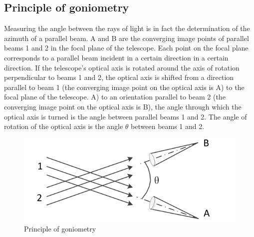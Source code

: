 \documentclass[UTF8]{article}
\begin{document}
	\subsection{Principle of goniometry}
	Measuring the angle between the rays of light is in fact the determination of the azimuth of a parallel beam. A and B are the converging image points of parallel beams 1 and 2 in the focal plane of the telescope. Each point on the focal plane corresponds to a parallel beam incident in a certain direction in a certain direction. If the telescope's optical axis is rotated around the axis of rotation perpendicular to beams 1 and 2, the optical axis is shifted from a direction parallel to beam 1 (the converging image point on the optical axis is A) to the focal plane of the telescope. A) to an orientation parallel to beam 2 (the converging image point on the optical axis is B), the angle through which the optical axis is turned is the angle between parallel beams 1 and 2. The angle of rotation of the optical axis is the angle $\theta $ between beams 1 and 2.
	\begin{figure}[H]
	                  			   					\centering
	                  			   					\includegraphics[clip,scale=1,trim={0 0 0 0}]{fig/fig9.png}
	                  			   					\caption{Principle of goniometry}
	                  			   					\label{figure.9}
	                  			   \end{figure} 
     
\end{document}
